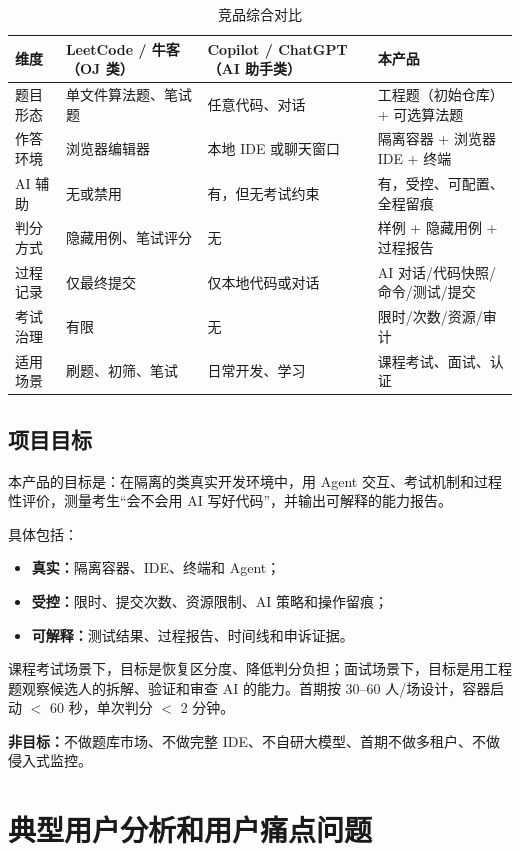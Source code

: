 \documentclass[UTF8,12pt,a4paper]{ctexart}
\begin{document}
\begin{table}[H]
\centering
\caption{竞品综合对比}
\label{tab:competitors}
\small
\begin{tabularx}{\textwidth}{|p{2.2cm}|Y|Y|Y|}
\hline
\textbf{维度} & \textbf{LeetCode / 牛客（OJ 类）} & \textbf{Copilot / ChatGPT（AI 助手类）} & \textbf{本产品} \\ \hline
题目形态 & 单文件算法题、笔试题 & 任意代码、对话 & 工程题（初始仓库）+ 可选算法题 \\ \hline
作答环境 & 浏览器编辑器 & 本地 IDE 或聊天窗口 & 隔离容器 + 浏览器 IDE + 终端 \\ \hline
AI 辅助 & 无或禁用 & 有，但无考试约束 & 有，受控、可配置、全程留痕 \\ \hline
判分方式 & 隐藏用例、笔试评分 & 无 & 样例 + 隐藏用例 + 过程报告 \\ \hline
过程记录 & 仅最终提交 & 仅本地代码或对话 & AI 对话/代码快照/命令/测试/提交 \\ \hline
考试治理 & 有限 & 无 & 限时/次数/资源/审计 \\ \hline
适用场景 & 刷题、初筛、笔试 & 日常开发、学习 & 课程考试、面试、认证 \\ \hline
\end{tabularx}
\end{table}

\subsection{项目目标}

本产品的目标是：在隔离的类真实开发环境中，用 Agent 交互、考试机制和过程性评价，测量考生“会不会用 AI 写好代码”，并输出可解释的能力报告。

具体包括：
\begin{itemize}[leftmargin=2em]
  \item \textbf{真实：}隔离容器、IDE、终端和 Agent；
  \item \textbf{受控：}限时、提交次数、资源限制、AI 策略和操作留痕；
  \item \textbf{可解释：}测试结果、过程报告、时间线和申诉证据。
\end{itemize}

课程考试场景下，目标是恢复区分度、降低判分负担；面试场景下，目标是用工程题观察候选人的拆解、验证和审查 AI 的能力。首期按 30--60 人/场设计，容器启动 $<$ 60 秒，单次判分 $<$ 2 分钟。

\textbf{非目标：}不做题库市场、不做完整 IDE、不自研大模型、首期不做多租户、不做侵入式监控。

\section{典型用户分析和用户痛点问题}
\end{document}

